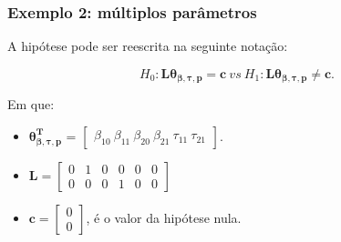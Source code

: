 \documentclass[10pt,
  aspectratio=169,
  serif,
  mathserif,
  professionalfont,
  compress,
  handout,
  ]{beamer}\usepackage[]{graphicx}\usepackage[]{color}
\begin{document}

\begin{frame}

\frametitle{Exemplo 2: múltiplos parâmetros}

A hipótese pode ser reescrita na seguinte notação:

$$H_0: \boldsymbol{L}\boldsymbol{\theta_{\beta,\tau,p}} = \boldsymbol{c} \ vs \ H_1: \boldsymbol{L}\boldsymbol{\theta_{\beta,\tau,p}} \neq \boldsymbol{c}.$$ 

Em que:

\begin{itemize}
  
  \item $\boldsymbol{\theta_{\beta,\tau,p}^T}$ = $\begin{bmatrix} \beta_{10} \  \beta_{11} \ \beta_{20} \ \beta_{21} \ \tau_{11} \ \tau_{21} \end{bmatrix}$.


\item $\boldsymbol{L} = \begin{bmatrix} 0 & 1 & 0 & 0 & 0 & 0 \\
0 & 0 & 0 & 1 & 0 & 0 \end{bmatrix}$
 
\item $\boldsymbol{c} = \begin{bmatrix} 0 \\ 0 \end{bmatrix}$, é o valor da hipótese nula. 

\end{itemize}

\end{frame}

\end{document}
